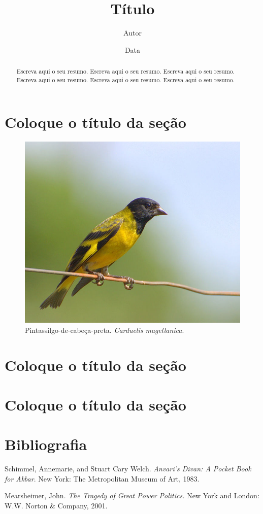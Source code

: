 \documentclass[a4paper,numbers=noenddot,abstract,DIV=calc]{scrartcl} %
\title{Título}
\author{Autor}
\date{Data}
\begin{document}
\frenchspacing

\maketitle

\begin{abstract}
Escreva aqui o seu resumo. Escreva aqui o seu resumo. Escreva aqui o seu resumo. Escreva aqui o seu resumo. Escreva aqui o seu resumo. Escreva aqui o seu resumo.
\end{abstract}

\tableofcontents %
\listoffigures %


\section{Coloque o título da seção}

\begin{figure}
\centering
\includegraphics[width=0.5\linewidth]{pintassilgo}
\caption{Pintassilgo-de-cabeça-preta. \textit{Carduelis magellanica}.}
\label{pintassilgo}
\end{figure}



\section{Coloque o título da seção}

\section{Coloque o título da seção}

\section*{Bibliografia}

\setlength{\parindent}{0pt}

Schimmel, Annemarie, and Stuart Cary Welch. \textit{Anvari's Divan: A Pocket Book for Akbar}.  New York: The Metropolitan Museum of Art, 1983.

\setlength{\parskip}{10pt} %

Mearsheimer, John. \textit{The Tragedy of Great Power Politics.} New York and London: W.W. Norton \& Company, 2001.
\end{document}
